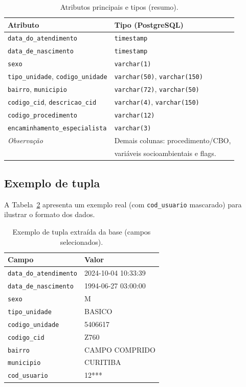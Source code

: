 \documentclass[12pt,a4paper]{article}
\begin{document}
\begin{table}[H]
\centering
\caption{Atributos principais e tipos (resumo).}
\label{tab:atributos}
\begin{tabular}{ll}
\toprule
\textbf{Atributo} & \textbf{Tipo (PostgreSQL)} \\
\midrule
\texttt{data\_do\_atendimento} & \texttt{timestamp} \\
\texttt{data\_de\_nascimento} & \texttt{timestamp} \\
\texttt{sexo} & \texttt{varchar(1)} \\
\texttt{tipo\_unidade}, \texttt{codigo\_unidade} & \texttt{varchar(50)}, \texttt{varchar(150)} \\
\texttt{bairro}, \texttt{municipio} & \texttt{varchar(72)}, \texttt{varchar(50)} \\
\texttt{codigo\_cid}, \texttt{descricao\_cid} & \texttt{varchar(4)}, \texttt{varchar(150)} \\
\texttt{codigo\_procedimento} & \texttt{varchar(12)} \\
\texttt{encaminhamento\_especialista} & \texttt{varchar(3)} \\
\midrule
\textit{Observação} & Demais colunas: procedimento/CBO, \\
 & variáveis socioambientais e flags. \\
\bottomrule
\end{tabular}
\end{table}

\subsection{Exemplo de tupla}
A Tabela~\ref{tab:tupla} apresenta um exemplo real (com \texttt{cod\_usuario} mascarado) para ilustrar o formato dos dados.

\begin{table}[H]
\centering
\caption{Exemplo de tupla extraída da base (campos selecionados).}
\label{tab:tupla}
\begin{tabular}{ll}
\toprule
\textbf{Campo} & \textbf{Valor} \\
\midrule
\texttt{data\_do\_atendimento} & 2024-10-04 10:33:39 \\
\texttt{data\_de\_nascimento} & 1994-06-27 03:00:00 \\
\texttt{sexo} & M \\
\texttt{tipo\_unidade} & BASICO \\
\texttt{codigo\_unidade} & 5406617 \\
\texttt{codigo\_cid} & Z760 \\
\texttt{bairro} & CAMPO COMPRIDO \\
\texttt{municipio} & CURITIBA \\
\texttt{cod\_usuario} & 12*** \\
\bottomrule
\end{tabular}
\end{table}
\end{document}
